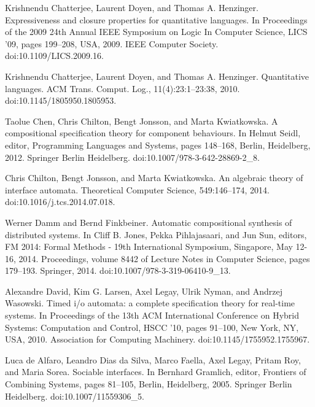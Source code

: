 \documentclass[10pt,a4paper]{article}
\begin{document}
\par\noindent  [7]  Krishnendu Chatterjee, Laurent Doyen, and Thomas A. Henzinger.  Expressiveness and closure properties for quantitative languages.  In Proceedings of the 2009 24th Annual IEEE Symposium on Logic In Computer Science, LICS ’09, pages 199–208, USA, 2009. IEEE Computer Society.  doi:10.1109/LICS.2009.16.  
 
\par\noindent  [8]  Krishnendu Chatterjee, Laurent Doyen, and Thomas A. Henzinger.  Quantitative languages.  ACM Trans. Comput. Log., 11(4):23:1–23:38, 2010.  doi:10.1145/1805950.1805953.  
 
\par\noindent  [9]  Taolue Chen, Chris Chilton, Bengt Jonsson, and Marta Kwiatkowska.  A compositional specification theory for component behaviours.  In Helmut Seidl, editor, Programming Languages and Systems, pages 148–168, Berlin, Heidelberg, 2012. Springer Berlin Heidelberg.  doi:10.1007/978-3-642-28869-2\_8.  
 
\par\noindent  [10]  Chris Chilton, Bengt Jonsson, and Marta Kwiatkowska.  An algebraic theory of interface automata.  Theoretical Computer Science, 549:146–174, 2014.  doi:10.1016/j.tcs.2014.07.018.  
 
\par\noindent  [11]  Werner Damm and Bernd Finkbeiner.  Automatic compositional synthesis of distributed systems.  In Cliff B. Jones, Pekka Pihlajasaari, and Jun Sun, editors, FM 2014: Formal Methods - 19th International Symposium, Singapore, May 12-16, 2014. Proceedings, volume 8442 of Lecture Notes in Computer Science, pages 179–193. Springer, 2014.  doi:10.1007/978-3-319-06410-9\_13.  
 
\par\noindent  [12]  Alexandre David, Kim G. Larsen, Axel Legay, Ulrik Nyman, and Andrzej Wasowski.  Timed i/o automata: a complete specification theory for real-time systems.  In Proceedings of the 13th ACM International Conference on Hybrid Systems: Computation and Control, HSCC ’10, pages 91–100, New York, NY, USA, 2010. Association for Computing Machinery.  doi:10.1145/1755952.1755967.  
 
\par\noindent  [13]  Luca de Alfaro, Leandro Dias da Silva, Marco Faella, Axel Legay, Pritam Roy, and Maria Sorea.  Sociable interfaces.  In Bernhard Gramlich, editor, Frontiers of Combining Systems, pages 81–105, Berlin, Heidelberg, 2005. Springer Berlin Heidelberg.  doi:10.1007/11559306\_5.  
 
\end{document}
